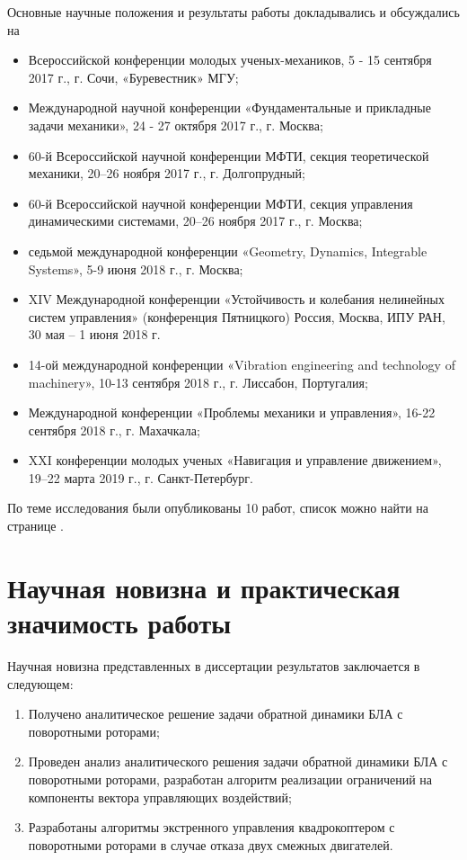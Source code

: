 Основные научные положения и результаты работы докладывались и обсуждались на 
\begin{itemize}
	\item Всероссийской конференции молодых ученых-механиков, 5 - 15 сентября 2017 г., г. Сочи, «Буревестник» МГУ;
	\item Международной научной конференции «Фундаментальные и прикладные задачи механики», 24 - 27 октября 2017 г., г. Москва;
	\item 60-й Всероссийской научной конференции МФТИ, секция теоретической механики, 20–26 ноября 2017 г., г. Долгопрудный;
	\item 60-й Всероссийской научной конференции МФТИ, секция управления динамическими системами, 20–26 ноября 2017 г., г. Москва;
	\item седьмой международной конференции «Geometry, Dynamics, Integrable Systems», 5-9 июня 2018 г., г. Москва;
	\item XIV Международной конференции «Устойчивость и колебания нелинейных систем управления» (конференция Пятницкого) Россия, Москва, ИПУ РАН, 30 мая -- 1 июня 2018 г.
	\item 14-ой международной конференции «Vibration engineering and technology of machinery», 10-13 сентября 2018 г., г. Лиссабон, Португалия;
	\item Международной конференции «Проблемы механики и управления», 16-22 сентября 2018 г., г. Махачкала;
	\item XXI конференции молодых ученых «Навигация и управление движением», 19–22 марта 2019 г., г. Санкт-Петербург.
\end{itemize}
По теме исследования были опубликованы 10 работ, список можно найти на странице \pageref{list_chapter}.

\section{Научная новизна и практическая значимость работы}
Научная новизна представленных в диссертации результатов заключается в следующем:
\begin{enumerate}
	\item  Получено аналитическое решение задачи обратной динамики БЛА с поворотными роторами;
	\item  Проведен анализ аналитического решения задачи обратной динамики  БЛА с поворотными роторами, разработан алгоритм реализации ограничений на компоненты вектора управляющих воздействий;
	\item  Разработаны алгоритмы экстренного управления квадрокоптером с поворотными роторами в случае отказа двух смежных двигателей.
\end{enumerate}

